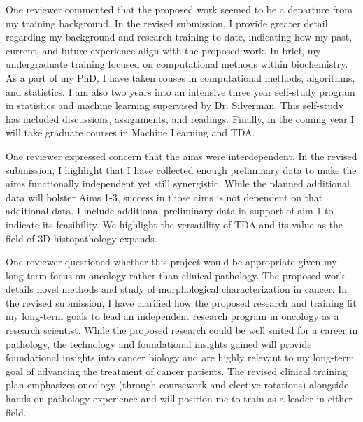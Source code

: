 \documentclass{nihgrant}
\begin{document}
One reviewer commented that the proposed work seemed to be a departure from my training background. In the revised submission, I provide greater detail regarding my background and research training to date, indicating how my past, current, and future experience align with the proposed work. In brief, my undergraduate training focused on computational methods within biochemistry. As a part of my PhD, I have taken couses in computational methods, algorithms, and statistics. I am also two years into an intensive three year self-study program in statistics and machine learning supervised by Dr. Silverman. This self-study has included discussions, assignments, and readings. Finally, in the coming year I will take graduate courses in Machine Learning and TDA.

One reviewer expressed concern that the aims were interdependent. In the revised submission, I highlight that I have collected enough preliminary data to make the aims functionally independent yet still synergistic. While the planned additional data will bolster Aims 1-3, success in those aims is not dependent on that additional data. I include additional preliminary data in support of aim 1 to indicate its feasibility. We highlight the versatility of TDA and its value as the field of 3D histopathology expands.

One reviewer questioned whether this project would be appropriate given my long-term focus on oncology rather than clinical pathology. The proposed work details novel methods and study of morphological characterization in cancer. In the revised submission, I have clarified how the proposed research and training fit my long-term goals to lead an independent research program in oncology as a research scientist. While the proposed research could be well suited for a career in pathology, the technology and foundational insights gained will provide foundational insights into cancer biology and are highly relevant to my long-term goal of advancing the treatment of cancer patients. The revised clinical training plan emphasizes oncology (through coursework and elective rotations) alongside hands-on pathology experience and will position me to train as a leader in either field.  %
\end{document}
